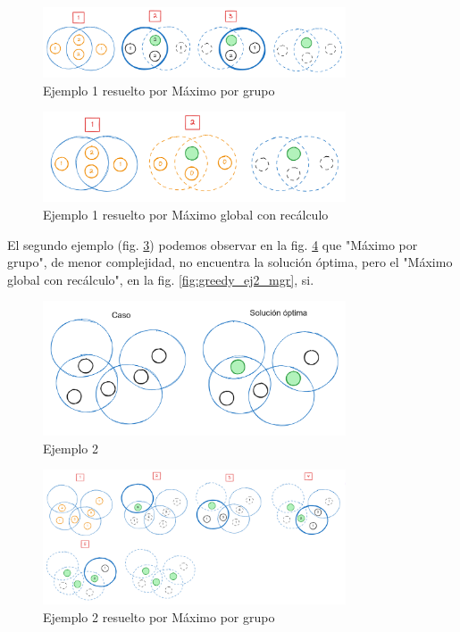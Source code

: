 \begin{figure}[H]
    \centering
    \includegraphics[width=0.8\textwidth]{img/greedy_ej1_mpg.png}
    \caption{Ejemplo 1 resuelto por Máximo por grupo}
    \label{fig:greedy_ej1_mpg}
\end{figure}

\begin{figure}[H]
    \centering
    \includegraphics[width=0.8\textwidth]{img/greedy_ej1_mgr.png}
    \caption{Ejemplo 1 resuelto por Máximo global con recálculo}
    \label{fig:greedy_ej1_mgr}
\end{figure}

El segundo ejemplo (fig. \ref{fig:greedy_ej2}) podemos observar en la fig. \ref{fig:greedy_ej2_mpg} que "Máximo por grupo", de menor complejidad, no encuentra la solución óptima, pero el "Máximo global con recálculo", en la fig. \ref{fig:greedy_ej2_mgr}, si.

\begin{figure}[H]
    \centering
    \includegraphics[width=0.8\textwidth]{img/greedy_ej2.png}
    \caption{Ejemplo 2}
    \label{fig:greedy_ej2}
\end{figure}

\begin{figure}[H]
    \centering
    \includegraphics[width=0.8\textwidth]{img/greedy_ej2_mpg.png}
    \caption{Ejemplo 2 resuelto por Máximo por grupo}
    \label{fig:greedy_ej2_mpg}
\end{figure}

